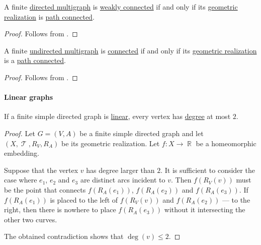 \begin{corollary}\label{thm:directed_multigraph_geometric_realization_connectedness}
  A finite \hyperref[def:directed_multigraph]{directed multigraph} is \hyperref[def:graph_connectedness/weak]{weakly connected} if and only if its \hyperref[def:graph_geometric_realization/undirected]{geometric realization} is \hyperref[def:path_connected_space]{path connected}.
\end{corollary}
\begin{proof}
  Follows from .
\end{proof}

\begin{corollary}\label{thm:undirected_multigraph_geometric_realization_connectedness}
  A finite \hyperref[def:undirected_multigraph]{undirected multigraph} is \hyperref[def:graph_connectedness/undirected]{connected} if and only if its \hyperref[def:graph_geometric_realization/undirected]{geometric realization} is a \hyperref[def:path_connected_space]{path connected}.
\end{corollary}
\begin{proof}
  Follows from .
\end{proof}

\paragraph{Linear graphs}

\begin{proposition}\label{thm:linear_directed multigraph_equivalence}
  If a finite simple directed graph is \hyperref[def:graph_geometric_realization/linear]{linear}, every vertex has \hyperref[def:graph_cardinality/directed_degree]{degree} at most \( 2 \).
\end{proposition}
\begin{proof}
  Let \( G = (V, A) \) be a finite simple directed graph and let \( (X, \mscrT, R_V, R_A) \) be its geometric realization. Let \( f: X \to \BbbR \) be a homeomorphic embedding.

  Suppose that the vertex \( v \) has degree larger than \( 2 \). It is sufficient to consider the case where \( e_1 \), \( e_2 \) and \( e_3 \) are distinct arcs incident to \( v \). Then \( f(R_V(v)) \) must be the point that connects \( f(R_A(e_1)) \), \( f(R_A(e_2)) \) and \( f(R_A(e_3)) \). If \( f(R_A(e_1)) \) is placed to the left of \( f(R_V(v)) \) and \( f(R_A(e_2)) \) --- to the right, then there is nowhere to place \( f(R_A(e_3)) \) without it intersecting the other two curves.

  The obtained contradiction shows that \( \deg(v) \leq 2 \).
\end{proof}

